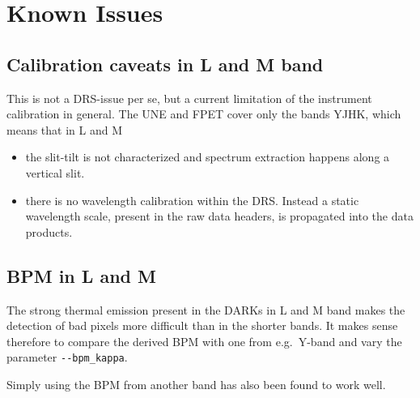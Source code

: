 \section{Known Issues}
\label{sec:knownissues}


\subsection{Calibration caveats in L and M band}

This is not a DRS-issue per se, but a current limitation of the instrument calibration in general. The UNE and FPET cover only the bands YJHK, which means that in L and M
\begin{itemize}
    \item the slit-tilt is not characterized and spectrum extraction happens along a vertical slit.
    \item there is no wavelength calibration within the DRS. Instead a static wavelength scale, present in the raw data headers, is propagated into the data products.
\end{itemize}


\subsection{BPM in L and M}

The strong thermal emission present in the DARKs in L and M band makes the detection of bad pixels more difficult than in the shorter bands. It makes sense therefore to compare the derived BPM with one from e.g.~Y-band and vary the parameter \verb!--bpm_kappa!.

Simply using the BPM from another band has also been found to work well.

